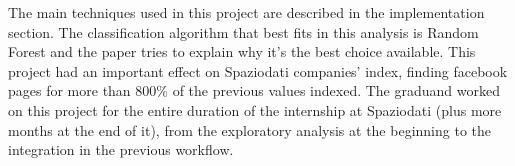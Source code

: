 The main techniques used in this project are described in the implementation section.
The classification algorithm that best fits in this analysis is Random Forest and the paper tries to explain why it's the best choice available.
This project had an important effect on Spaziodati companies' index, finding facebook pages for more than 800\% of the previous values indexed.
The graduand worked on this project for the entire duration of the internship at Spaziodati (plus more months at the end of it), from the exploratory analysis at the beginning to the integration in the previous workflow.
%
%




